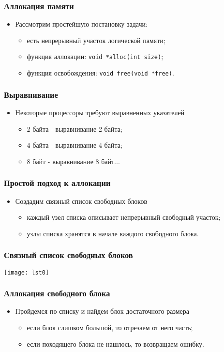 \begin{frame}[fragile]
\frametitle{Аллокация памяти}
\begin{itemize}
    \item<1->Рассмотрим простейшую постановку задачи:
    \begin{itemize}
        \item<2->есть непрерывный участок логической памяти;
        \item<3->функция аллокации: \lstinline|void *alloc(int size)|;
        \item<4->функция освобождения: \lstinline|void free(void *free)|.
    \end{itemize}
\end{itemize}
\end{frame}

\begin{frame}
\frametitle{Выравнивание}
\begin{itemize}
    \item<1->Некоторые процессоры требуют выравненных указателей
    \begin{itemize}
        \item<2->2 байта - выравнивание 2 байта;
        \item<3->4 байта - выравнивание 4 байта;
        \item<4->8 байт - выравнивание 8 байт...
    \end{itemize}
\end{itemize}
\end{frame}

\begin{frame}
\frametitle{Простой подход к аллокации}
\begin{itemize}
    \item<1->Создадим связный список свободных блоков
    \begin{itemize}
        \item<1->каждый узел списка описывает непрерывный свободный участок;
        \item<2->узлы списка хранятся в начале каждого свободного блока.
    \end{itemize}
\end{itemize}
\end{frame}

\begin{frame}
\frametitle{Связный список свободных блоков}
\texttt{[image: lst0]}
\end{frame}

\begin{frame}
\frametitle{Аллокация свободного блока}
\begin{itemize}
    \item<1->Пройдемся по списку и найдем блок достаточного размера
    \begin{itemize}
        \item<2->если блок слишком большой, то отрезаем от него часть;
        \item<3->если походящего блока не нашлось, то возвращаем ошибку.
    \end{itemize}
\end{itemize}
\end{frame}

